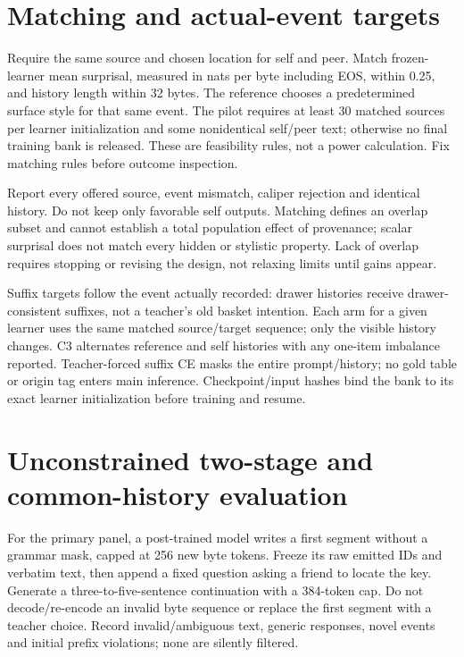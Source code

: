 \documentclass[11pt,a4paper]{article}
\begin{document}
\section{Matching and actual-event targets}
Require the same source and chosen location for self and peer. Match frozen-
learner mean surprisal, measured in nats per byte including EOS, within 0.25,
and history length within 32 bytes. The reference chooses a predetermined
surface style for that same event. The pilot requires at least 30 matched
sources per learner initialization and some nonidentical self/peer text;
otherwise no final training bank is released. These are feasibility rules,
not a power calculation. Fix matching rules before outcome inspection.

Report every offered source, event mismatch, caliper rejection and identical
history. Do not keep only favorable self outputs. Matching defines an overlap
subset and cannot establish a total population effect of provenance; scalar
surprisal does not match every hidden or stylistic property. Lack of overlap
requires stopping or revising the design, not relaxing limits until gains appear.

Suffix targets follow the event actually recorded: drawer histories receive
drawer-consistent suffixes, not a teacher's old basket intention. Each arm for
a given learner uses the same matched source/target sequence; only the visible
history changes. C3 alternates reference and self histories with any one-item
imbalance reported. Teacher-forced suffix CE masks the entire prompt/history;
no gold table or origin tag enters main inference. Checkpoint/input hashes
bind the bank to its exact learner initialization before training and resume.



\section{Unconstrained two-stage and common-history evaluation}
For the primary panel, a post-trained model writes a first segment without a
grammar mask, capped at 256 new byte tokens. Freeze its raw emitted IDs and
verbatim text, then append a fixed question asking a friend to locate the key.
Generate a three-to-five-sentence continuation with a 384-token cap. Do not
decode/re-encode an invalid byte sequence or replace the first segment with a
teacher choice. Record invalid/ambiguous text, generic responses, novel events
and initial prefix violations; none are silently filtered.
\end{document}
